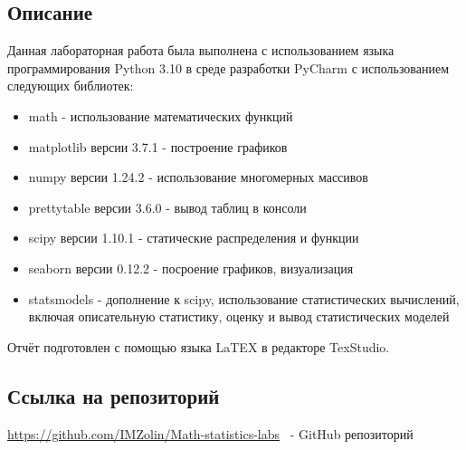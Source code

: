 \documentclass[a4paper,14pt]{article}
\begin{document}
	\subsection{Описание}
	Данная лабораторная работа была выполнена с использованием языка
	программирования Python 3.10 в среде разработки PyCharm с
	использованием следующих библиотек:
	\begin{itemize}
		\item math - использование математических функций
		\item matplotlib версии 3.7.1 - построение графиков
		\item numpy версии 1.24.2 - использование многомерных массивов
		\item prettytable версии 3.6.0 - вывод таблиц в консоли 
		\item scipy версии 1.10.1 - статические распределения и функции
		\item seaborn версии 0.12.2 - посроение графиков, визуализация
		\item statsmodels - дополнение к scipy, использование статистических вычислений, включая описательную статистику, оценку и вывод статистических моделей
	\end{itemize}
	Отчёт подготовлен с помощью языка LaTEX в редакторе TexStudio.
		\subsection{Ссылка на репозиторий}
		\url{https://github.com/IMZolin/Math-statistics-labs} \ - GitHub репозиторий
	
\end{document}
